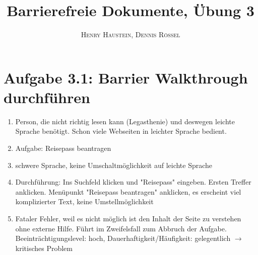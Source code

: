 \documentclass{article}
\title{\textbf{Barrierefreie Dokumente, Übung 3}}
\author{\textsc{Henry Haustein}, \textsc{Dennis Rössel}}
\date{}
\begin{document}
	\maketitle
	
	\section*{Aufgabe 3.1: Barrier Walkthrough durchführen}
	\begin{enumerate}[label=(\alph*)]
		\item Person, die nicht richtig lesen kann (Legasthenie) und deswegen leichte Sprache benötigt. Schon viele Webseiten in leichter Sprache bedient.
		\item Aufgabe: Reisepass beantragen
		\item schwere Sprache, keine Umschaltmöglichkeit auf leichte Sprache
		\item Durchführung: Ins Suchfeld klicken und "Reisepass" eingeben. Ersten Treffer anklicken. Menüpunkt "Reisepass beantragen" anklicken, es erscheint viel komplizierter Text, keine Umstellmöglichkeit
		\item Fataler Fehler, weil es nicht möglich ist den Inhalt der Seite zu verstehen ohne externe Hilfe. Führt im Zweifelsfall zum Abbruch der Aufgabe. Beeinträchtigungslevel: hoch, Dauerhaftigkeit/Häufigkeit: gelegentlich $\to$ kritisches Problem
	\end{enumerate}
	
\end{document}
